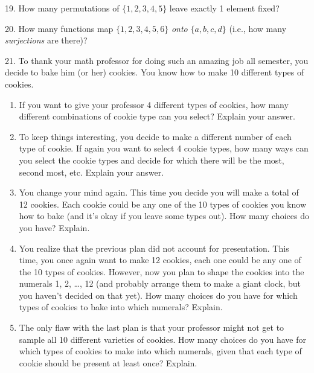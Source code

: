 \documentclass[10pt,]{book}
\theoremstyle{plain}
\theoremstyle{definition}
\theoremstyle{definition}
\theoremstyle{definition}
\numberwithin{equation}{section}
\begin{document}
\begin{exerciselist}
\par\smallskip
\item[19.]\hypertarget{exercise-120}{}
            How many permutations of \(\{1,2,3,4,5\}\) leave exactly 1 element fixed?
\par\smallskip
\item[20.]\hypertarget{exercise-121}{}
            How many functions map \(\{1,2,3,4,5,6\}\) \emph{onto} \(\{a,b,c,d\}\) (i.e., how many \emph{surjections} are there)?
\par\smallskip
\item[21.]\hypertarget{exr_cookie-counting}{}
            To thank your math professor for doing such an amazing job all semester, you decide to bake him (or her) cookies. You know how to make 10 different types of cookies.
          \leavevmode%
\begin{enumerate}[label=(\alph*)]
\item\hypertarget{li-761}{}
                If you want to give your professor 4 different types of cookies, how many different combinations of cookie type can you select? Explain your answer.
\item\hypertarget{li-762}{}
                To keep things interesting, you decide to make a different number of each type of cookie. If again you want to select 4 cookie types, how many ways can you select the cookie types and decide for which there will be the most, second most, etc. Explain your answer.
\item\hypertarget{li-763}{}
                You change your mind again. This time you decide you will make a total of 12 cookies. Each cookie could be any one of the 10 types of cookies you know how to bake (and it's okay if you leave some types out). How many choices do you have? Explain.
\item\hypertarget{li-764}{}
                You realize that the previous plan did not account for presentation. This time, you once again want to make 12 cookies, each one could be any one of the 10 types of cookies. However, now you plan to shape the cookies into the numerals 1, 2,
                \dots{}, 12 (and probably arrange them to make a giant clock, but you haven't decided on that yet). How many choices do you have for which types of cookies to bake into which numerals? Explain.
\item\hypertarget{li-765}{}
                The only flaw with the last plan is that your professor might not get to sample all 10 different varieties of cookies. How many choices do you have for which types of cookies to make into which numerals, given that each type of cookie should be present at least once? Explain.
\end{enumerate}


\end{exerciselist}
\end{document}
